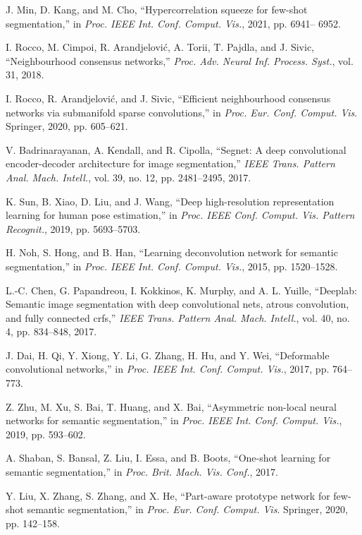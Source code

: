 \documentclass[lettersize,journal]{IEEEtran}
\begin{document}
\begin{thebibliography}{10}
J. Min, D. Kang, and M. Cho, “Hypercorrelation squeeze for few-shot segmentation,” in \textit{Proc. IEEE Int. Conf. Comput. Vis.}, 2021, pp. 6941– 6952.

I. Rocco, M. Cimpoi, R. Arandjelović, A. Torii, T. Pajdla, and J. Sivic,  “Neighbourhood consensus networks,” \textit{Proc. Adv. Neural Inf. Process. Syst.}, vol. 31, 2018.

I. Rocco, R. Arandjelović, and J. Sivic, “Efficient neighbourhood consensus networks via submanifold sparse convolutions,” in \textit{Proc. Eur. Conf. Comput. Vis}. Springer, 2020, pp. 605–621.

V. Badrinarayanan, A. Kendall, and R. Cipolla, “Segnet: A deep convolutional encoder-decoder architecture for image segmentation,” \textit{IEEE Trans. Pattern Anal. Mach. Intell.}, vol. 39, no. 12, pp. 2481–2495, 2017.

K. Sun, B. Xiao, D. Liu, and J. Wang, “Deep high-resolution representation learning for human pose estimation,” in \textit{Proc. IEEE Conf. Comput. Vis. Pattern Recognit.}, 2019, pp. 5693–5703.

H. Noh, S. Hong, and B. Han, “Learning deconvolution network for semantic segmentation,” in \textit{Proc. IEEE Int. Conf. Comput. Vis.}, 2015, pp. 1520–1528.

L.-C. Chen, G. Papandreou, I. Kokkinos, K. Murphy, and A. L. Yuille, “Deeplab: Semantic image segmentation with deep convolutional nets, atrous convolution, and fully connected crfs,” \textit{IEEE Trans. Pattern Anal. Mach. Intell.}, vol. 40, no. 4, pp. 834–848, 2017.

J. Dai, H. Qi, Y. Xiong, Y. Li, G. Zhang, H. Hu, and Y. Wei, “Deformable convolutional networks,” in \textit{Proc. IEEE Int. Conf. Comput. Vis.}, 2017, pp. 764–773.

Z. Zhu, M. Xu, S. Bai, T. Huang, and X. Bai, “Asymmetric non-local neural networks for semantic segmentation,” in \textit{Proc. IEEE Int. Conf. Comput. Vis.}, 2019, pp. 593–602.

A. Shaban, S. Bansal, Z. Liu, I. Essa, and B. Boots, “One-shot learning for semantic segmentation,” in \textit{Proc. Brit. Mach. Vis. Conf.}, 2017.

Y. Liu, X. Zhang, S. Zhang, and X. He, “Part-aware prototype network for few-shot semantic segmentation,” in \textit{Proc. Eur. Conf. Comput. Vis}. Springer, 2020, pp. 142–158.


\end{thebibliography}
\end{document}
